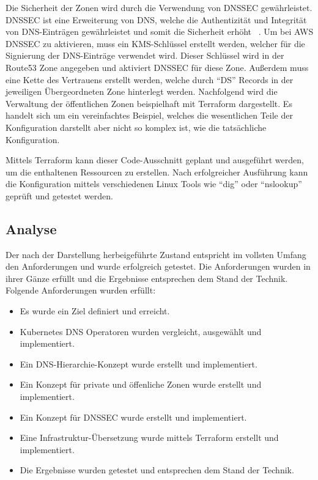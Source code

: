 Die Sicherheit der Zonen wird durch die Verwendung von \ac{DNSSEC} gewährleistet.
DNSSEC ist eine Erweiterung von DNS, welche die Authentizität und Integrität von DNS-Einträgen gewährleistet und somit die Sicherheit erhöht ~\cite{kelm2001sicherheit}.
Um bei AWS DNSSEC zu aktivieren, muss ein KMS-Schlüssel erstellt werden, welcher für die Signierung der DNS-Einträge verwendet wird.
Dieser Schlüssel wird in der Route53 Zone angegeben und aktiviert DNSSEC für diese Zone.
Außerdem muss eine Kette des Vertrauens erstellt werden, welche durch \enquote{DS} Records in der jeweiligen Übergeordneten Zone hinterlegt werden.
Nachfolgend wird die Verwaltung der öffentlichen Zonen beispielhaft mit Terraform dargestellt.
Es handelt sich um ein vereinfachtes Beispiel, welches die wesentlichen Teile der Konfiguration darstellt aber nicht so komplex ist, wie die tatsächliche Konfiguration.
\medskip



Mittels Terraform kann dieser Code-Ausschnitt geplant und ausgeführt werden, um die enthaltenen Ressourcen zu erstellen.
Nach erfolgreicher Ausführung kann die Konfiguration mittels verschiedenen Linux Tools wie \enquote{dig} oder \enquote{nslookup} geprüft und getestet werden.

\subsection{Analyse}
\label{subsec:description:analyse}
Der nach der Darstellung herbeigeführte Zustand entspricht im vollsten Umfang den Anforderungen und wurde erfolgreich getestet.
Die Anforderungen wurden in ihrer Gänze erfüllt und die Ergebnisse entsprechen dem Stand der Technik.
\medskip
Folgende Anforderungen wurden erfüllt:
\begin{itemize}
    \item Es wurde ein Ziel definiert und erreicht.
    \item Kubernetes DNS Operatoren wurden vergleicht, ausgewählt und implementiert.
    \item Ein DNS-Hierarchie-Konzept wurde erstellt und implementiert.
    \item Ein Konzept für private und öffenliche Zonen wurde erstellt und implementiert.
    \item Ein Konzept für DNSSEC wurde erstellt und implementiert.
    \item Eine Infrastruktur-Übersetzung wurde mittels Terraform erstellt und implementiert.
    \item Die Ergebnisse wurden getestet und entsprechen dem Stand der Technik.
\end{itemize}

